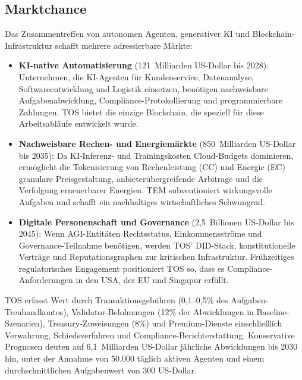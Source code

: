 \documentclass[11pt]{article}
\begin{document}
\subsection{Marktchance}
Das Zusammentreffen von autonomen Agenten, generativer KI und Blockchain-Infrastruktur schafft mehrere adressierbare Märkte:
\begin{itemize}[noitemsep]
  \item \textbf{KI-native Automatisierung} (121~Milliarden US-Dollar bis 2028): Unternehmen, die KI-Agenten für Kundenservice, Datenanalyse, Softwareentwicklung und Logistik einsetzen, benötigen nachweisbare Aufgabenabwicklung, Compliance-Protokollierung und programmierbare Zahlungen. TOS bietet die einzige Blockchain, die speziell für diese Arbeitsabläufe entwickelt wurde.
  \item \textbf{Nachweisbare Rechen- und Energiemärkte} (850~Milliarden US-Dollar bis 2035): Da KI-Inferenz- und Trainingskosten Cloud-Budgets dominieren, ermöglicht die Tokenisierung von Rechenleistung (CC) und Energie (EC) granulare Preisgestaltung, anbieterübergreifende Arbitrage und die Verfolgung erneuerbarer Energien. TEM subventioniert wirkungsvolle Aufgaben und schafft ein nachhaltiges wirtschaftliches Schwungrad.
  \item \textbf{Digitale Personenschaft und Governance} (2,5~Billionen US-Dollar bis 2045): Wenn AGI-Entitäten Rechtsstatus, Einkommensströme und Governance-Teilnahme benötigen, werden TOS' DID-Stack, konstitutionelle Verträge und Reputationsgraphen zur kritischen Infrastruktur. Frühzeitiges regulatorisches Engagement positioniert TOS so, dass es Compliance-Anforderungen in den USA, der EU und Singapur erfüllt.
\end{itemize}

TOS erfasst Wert durch Transaktionsgebühren (0,1--0,5\% des Aufgaben-Treuhandkontos), Validator-Belohnungen (12\% der Abwicklungen in Baseline-Szenarien), Treasury-Zuweisungen (8\%) und Premium-Dienste einschließlich Verwahrung, Schiedsverfahren und Compliance-Berichterstattung. Konservative Prognosen deuten auf 6,1~Milliarden US-Dollar jährliche Abwicklungen bis 2030 hin, unter der Annahme von 50.000 täglich aktiven Agenten und einem durchschnittlichen Aufgabenwert von 300 US-Dollar.
\end{document}
